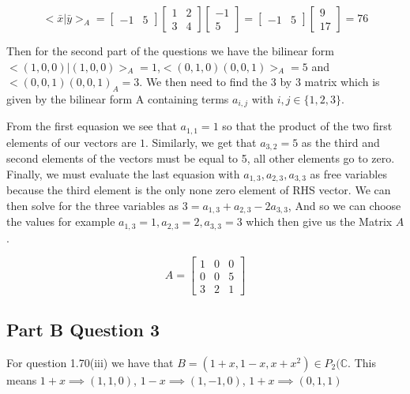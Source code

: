 \documentclass{article}
\begin{document}
\begin{equation*}
    <\bar{x}|\bar{y}>_A = \begin{bmatrix}
        -1 & 5
    \end{bmatrix}
    \begin{bmatrix}
        1&2\\3&4
    \end{bmatrix}
    \begin{bmatrix}
        -1\\5
    \end{bmatrix}
    =
    \begin{bmatrix}
        -1 & 5
    \end{bmatrix}
    \begin{bmatrix}
        9\\17
    \end{bmatrix}
    = 76
\end{equation*}

Then for the second part of the questions we have the bilinear form $<(1,0,0)|(1,0,0)>_A = 1$,$<(0,1,0)(0,0,1)>_A = 5$ and $<(0,0,1)(0,0,1)_A = 3$. We then need to find the $3$ by $3$ matrix which is given by the bilinear form A containing terms $a_{i,j}$ with $i,j \in \{ 1,2,3\}$.

From the first equasion we see that $a_{1,1} = 1$ so that the product of the two first elements of our vectors are $1$. Similarly, we get that $a_{3,2} = 5$ as the third and second elements of the vectors must be equal to 5, all other elements go to zero. Finally, we must evaluate the last equasion with $a_{1,3}, a_{2,3}, a_{3,3}$ as free variables because the third element is the only none zero element of RHS vector. We can then solve for the three variables as $3 = a_{1,3} + a_{2,3} - 2 a_{3,3}$, And so we can choose the values for example $a_{1,3} = 1, a_{2,3} = 2, a_{3,3} = 3$ which then give us the Matrix $A$.

\begin{equation*}
    A = \begin{bmatrix}
        1&0&0 \\ 0 & 0 & 5 \\ 3 & 2 & 1
    \end{bmatrix}
\end{equation*}

\subsection{Part B Question 3}
 For question 1.70(iii) we have that $B = (1+x,1-x,x + x^2) \in P_2(\mathbb{C}$. This means $1+x \implies (1,1,0)$, $1-x \implies (1,-1,0)$, $1+x \implies (0,1,1)$
\end{document}
